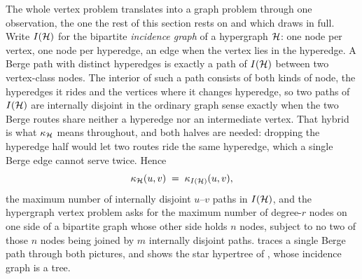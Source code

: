The whole vertex problem translates into a graph problem through one
observation, the one the rest of this section rests on and which
 draws in full. Write $I(\mathcal{H})$ for the bipartite
\emph{incidence graph} of a
hypergraph $\mathcal{H}$: one node per vertex, one node per hyperedge, an edge when
the vertex lies in the hyperedge. A Berge path with distinct hyperedges is
exactly a path of $I(\mathcal{H})$ between two vertex-class nodes. The interior of such
a path consists of both kinds of node, the hyperedges it rides and the vertices
where it changes hyperedge, so two paths of $I(\mathcal{H})$ are internally disjoint in
the ordinary graph sense exactly when the two Berge routes share neither a
hyperedge nor an intermediate vertex. That hybrid is what $\kappa_{\mathcal{H}}$ means
throughout, and both halves are needed: dropping the hyperedge half would let two
routes ride the same hyperedge, which a single Berge edge cannot serve twice.
Hence
\[
    \kappa_{\mathcal{H}}(u, v) \;=\; \kappa_{I(\mathcal{H})}(u, v),
\]
the maximum number of internally disjoint $u$--$v$ paths in $I(\mathcal{H})$, and the
hypergraph vertex problem asks for the maximum number of degree-$r$ nodes on
one side of a bipartite graph whose other side holds $n$ nodes, subject to no
two of those $n$ nodes being joined by $m$ internally disjoint paths.
 traces a single Berge path through both pictures,
and  shows the star hypertree of
, whose incidence graph is a tree.

